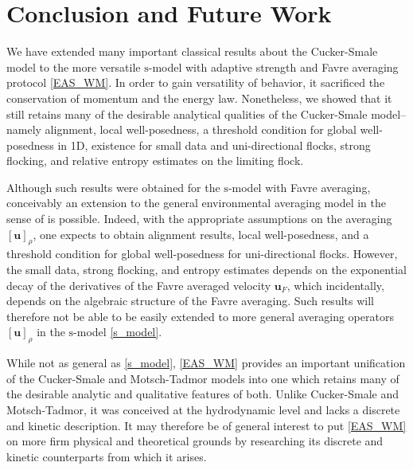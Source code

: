 \documentclass[11pt,letterpaper]{amsart}
\theoremstyle{plain}
\theoremstyle{definition}
\theoremstyle{remark}
\def\u{\textbf{u}}
\def \st {\mathrm{s}}
\begin{document}
\section{Conclusion and Future Work}
We have extended many important classical results about the Cucker-Smale model to the more versatile $\st$-model with adaptive strength and Favre averaging protocol \eqref{EAS_WM}. 
In order to gain versatility of behavior, it sacrificed the conservation of momentum and the energy law. 
Nonetheless, we showed that it still retains many of the desirable analytical qualities of the Cucker-Smale model-- namely
alignment, local well-posedness, a threshold condition 
for global well-posedness in 1D, existence for small data and uni-directional flocks, strong flocking, and relative entropy estimates on the limiting flock.

Although such results were obtained for the $\st$-model with Favre averaging, conceivably an extension to the general environmental averaging model in the sense of \cite{Sbook} is possible.  Indeed, with the appropriate assumptions on the 
averaging $[\u]_{\rho}$, one expects to obtain alignment results, local well-posedness, and a threshold condition 
for global well-posedness for uni-directional flocks.  However, the small data, strong flocking, and entropy estimates 
depends on the exponential decay of the derivatives of the Favre averaged velocity $\u_F$, which incidentally, depends on the algebraic structure 
of the Favre averaging.  Such results will therefore not be able to be easily extended to more general averaging 
operators $[\u]_{\rho}$ in the $\st$-model \eqref{s_model}.

While not as general as \eqref{s_model}, \eqref{EAS_WM} provides an important unification of the Cucker-Smale and Motsch-Tadmor models 
into one which retains many of the desirable analytic and qualitative features of both.
Unlike Cucker-Smale and Motsch-Tadmor, it was conceived at the hydrodynamic level and lacks a discrete and kinetic description. 
It may therefore be of general interest to put \eqref{EAS_WM} on more firm physical and theoretical grounds by researching its  
discrete and kinetic counterparts from which it arises.    
\end{document}
